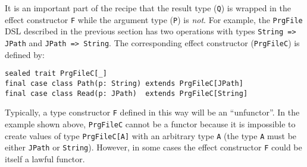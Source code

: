 It is an important part of the recipe that the result type (\lstinline!Q!)
is wrapped in the effect constructor \lstinline!F!
while the argument type (\lstinline!P!)
is \emph{not}. For example, the \lstinline!PrgFile!
DSL described in the previous section has two operations with types
\lstinline!String => JPath!
and \lstinline!JPath => String!.
The corresponding effect constructor (\lstinline!PrgFileC!)
is defined by:
\begin{lstlisting}
sealed trait PrgFileC[_]
final case class Path(p: String) extends PrgFileC[JPath]
final case class Read(p: JPath)  extends PrgFileC[String]
\end{lstlisting}
Typically, a type constructor \lstinline!F!
defined in this way will be an \textsf{``}unfunctor\textsf{''}.
In the example shown above, \lstinline!PrgFileC!
cannot be a functor because it is impossible to create values of type
\lstinline!PrgFileC[A]!
with an arbitrary type \lstinline!A!
(the type \lstinline!A!
must be either \lstinline!JPath!
or \lstinline!String!).
However, in some cases the effect constructor \lstinline!F!
could be itself a lawful functor.

